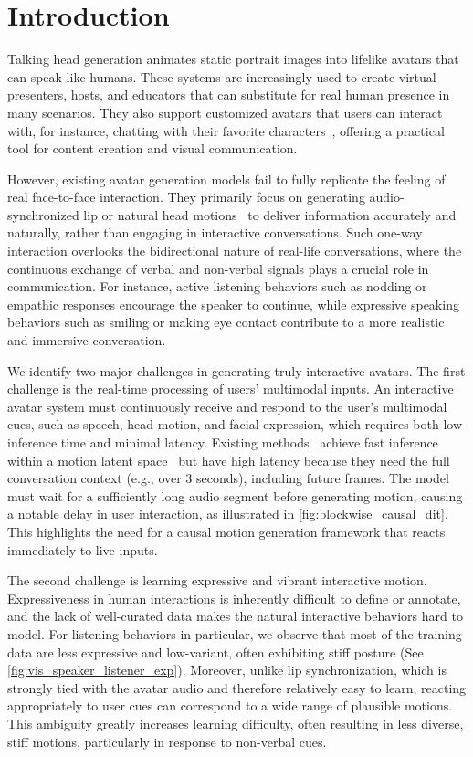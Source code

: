 \section{Introduction}\label{sec:intro}
Talking head generation animates static portrait images into lifelike avatars that can speak like humans. These systems are increasingly used to create virtual presenters, hosts, and educators that can substitute for real human presence in many scenarios. They also support customized avatars that users can interact with, for instance, chatting with their favorite characters~\citep{synthesia, hedra, pika}, offering a practical tool for content creation and visual communication.

However, existing avatar generation models fail to fully replicate the feeling of real face-to-face interaction. They primarily focus on generating audio-synchronized lip or natural head motions~\citep{vasa_1, float, emo, omnihuman, magicinfinite, talkingmachines, mocha, hunyuanportrait} to deliver information accurately and naturally, rather than engaging in interactive conversations. Such one-way interaction overlooks the bidirectional nature of real-life conversations, where the continuous exchange of verbal and non-verbal signals plays a crucial role in communication. For instance, active listening behaviors such as nodding or empathic responses encourage the speaker to continue, while expressive speaking behaviors such as smiling or making eye contact contribute to a more realistic and immersive conversation.


We identify two major challenges in generating truly interactive avatars. The first challenge is the real-time processing of users’ multimodal inputs. An interactive avatar system must continuously receive and respond to the user’s multimodal cues, such as speech, head motion, and facial expression,  which requires both low inference time and minimal latency. Existing methods~\citep{infp} achieve fast inference within a motion latent space~\citep{megaportrait} but have high latency because they need the full conversation context (e.g., over 3 seconds), including future frames. The model must wait for a sufficiently long audio segment before generating motion, causing a notable delay in user interaction, as illustrated in \cref{fig:blockwise_causal_dit}. This highlights the need for a causal motion generation framework that reacts immediately to live inputs.


The second challenge is learning expressive and vibrant interactive motion. Expressiveness in human interactions is inherently difficult to define or annotate, and the lack of well-curated data makes the natural interactive behaviors hard to model. For listening behaviors in particular, we observe that most of the training data are less expressive and low-variant, often exhibiting stiff posture (See \cref{fig:vis_speaker_listener_exp}). Moreover, unlike lip synchronization, which is strongly tied with the avatar audio and therefore relatively easy to learn, reacting appropriately to user cues can correspond to a wide range of plausible motions. This ambiguity greatly increases learning difficulty, often resulting in less diverse, stiff motions, particularly in response to non-verbal cues.



